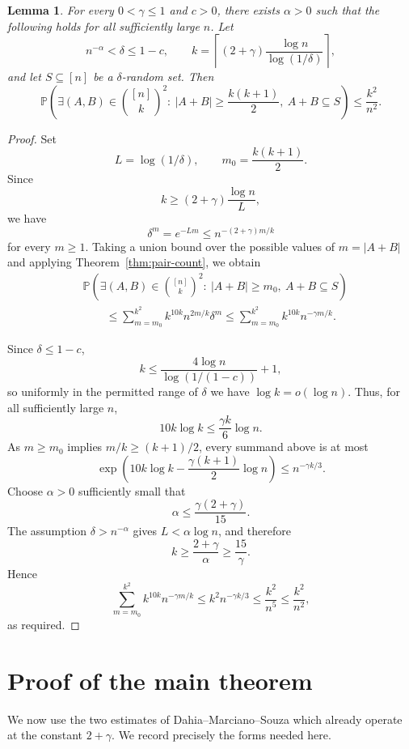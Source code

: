 \documentclass[11pt]{article}
\newtheorem{lemma}[theorem]{Lemma}
\newcommand{\Prob}{\mathbb{P}}
\begin{document}
\begin{lemma}\label{lem:large-random}
For every $0<\gamma\le1$ and $c>0$, there exists $\alpha>0$ such that the following holds for all sufficiently large $n$.  Let
\[
 n^{-\alpha}<\delta\le1-c,
\qquad
 k=\left\lceil(2+\gamma)\frac{\log n}{\log(1/\delta)}\right\rceil,
\]
and let $S\subseteq[n]$ be a $\delta$-random set.  Then
\[
 \Prob\left(
 \exists(A,B)\in\binom{[n]}{k}^2:\
 |A+B|\ge\frac{k(k+1)}2,\ A+B\subseteq S
 \right)
 \le \frac{k^2}{n^2}.
\]
\end{lemma}

\begin{proof}
Set
\[
 L=\log(1/\delta),\qquad m_0=\frac{k(k+1)}2.
\]
Since
\[
 k\ge (2+\gamma)\frac{\log n}{L},
\]
we have
\begin{equation}\label{eq:delta-decay}
 \delta^m=e^{-Lm}\le n^{-(2+\gamma)m/k}
\end{equation}
for every $m\ge1$.  Taking a union bound over the possible values of $m=|A+B|$ and applying Theorem~\ref{thm:pair-count}, we obtain
\begin{align*}
 &\Prob\left(
 \exists(A,B)\in\binom{[n]}{k}^2:\
 |A+B|\ge m_0,\ A+B\subseteq S
 \right)\\
 &\qquad\le
 \sum_{m=m_0}^{k^2}k^{10k}n^{2m/k}\delta^m
 \le
 \sum_{m=m_0}^{k^2}k^{10k}n^{-\gamma m/k}.
\end{align*}

Since $\delta\le1-c$,
\[
 k\le \frac{4\log n}{\log(1/(1-c))}+1,
\]
so uniformly in the permitted range of $\delta$ we have $\log k=o(\log n)$.  Thus, for all sufficiently large $n$,
\[
 10k\log k\le \frac{\gamma k}{6}\log n.
\]
As $m\ge m_0$ implies $m/k\ge(k+1)/2$, every summand above is at most
\[
 \exp\left(10k\log k-\frac{\gamma(k+1)}2\log n\right)
 \le n^{-\gamma k/3}.
\]
Choose $\alpha>0$ sufficiently small that
\[
 \alpha\le \frac{\gamma(2+\gamma)}{15}.
\]
The assumption $\delta>n^{-\alpha}$ gives $L<\alpha\log n$, and therefore
\[
 k\ge\frac{2+\gamma}{\alpha}\ge\frac{15}{\gamma}.
\]
Hence
\[
 \sum_{m=m_0}^{k^2}k^{10k}n^{-\gamma m/k}
 \le k^2n^{-\gamma k/3}
 \le \frac{k^2}{n^5}
 \le \frac{k^2}{n^2},
\]
as required.
\end{proof}

\section{Proof of the main theorem}

We now use the two estimates of Dahia--Marciano--Souza which already operate at the constant $2+\gamma$.  We record precisely the forms needed here.
\end{document}
